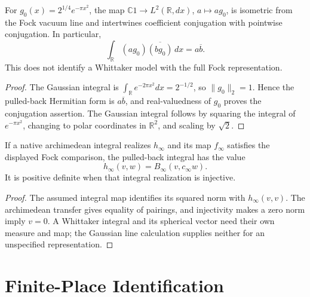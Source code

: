\begin{lemma}
\label{v4-arith:kp:lem:arch-whittaker-is-fock}
\label{v4-arith:kp:lem:Whittaker-is-Fock}
For \(g_0(x)=2^{1/4}e^{-\pi x^2}\), the map
\(\mathbb C1\to L^2(\mathbb R,dx)\), \(a\mapsto ag_0\), is isometric
from the Fock vacuum line and intertwines coefficient conjugation
with pointwise conjugation. In particular,
\begin{equation}
 \int_{\mathbb R}(ag_0)\overline{(bg_0)}\,dx=a\overline b.
 \label{v4-arith:kp:eq:Pet-arch-Whittaker}
\end{equation}
This does not identify a Whittaker model
with the full Fock representation.
\end{lemma}
\begin{proof}
The Gaussian integral is \(\int_{\mathbb R}e^{-2\pi x^2}dx=2^{-1/2}\),
so \(\|g_0\|_2=1\). Hence the pulled-back Hermitian form is
\(a\overline b\), and real-valuedness of \(g_0\) proves the
conjugation assertion. The Gaussian integral follows by squaring the
integral of \(e^{-\pi x^2}\), changing to polar coordinates in
\(\mathbb R^2\), and scaling by \(\sqrt2\).
\end{proof}

\begin{proposition}
\label{v4-arith:kp:prop:Pet-is-Segal-infty}
If a native archimedean integral realizes \(h_\infty\) and its map
\(f_\infty\) satisfies the displayed Fock comparison, the pulled-back
integral has the value
\begin{equation}
 h_\infty(v,w)=B_\infty(v,c_\infty w).
 \label{v4-arith:kp:eq:Pet-infty}
\end{equation}
It is positive definite
when that integral realization is injective.
\end{proposition}
\begin{proof}
The assumed integral map identifies its squared norm with
\(h_\infty(v,v)\). The archimedean transfer gives equality of pairings,
and injectivity makes a zero norm imply \(v=0\). A Whittaker integral
and its spherical vector need their own measure and map; the Gaussian
line calculation supplies neither for an unspecified representation.
\end{proof}


\section{Finite-Place Identification}
\label{v4-arith:kp:finite}

